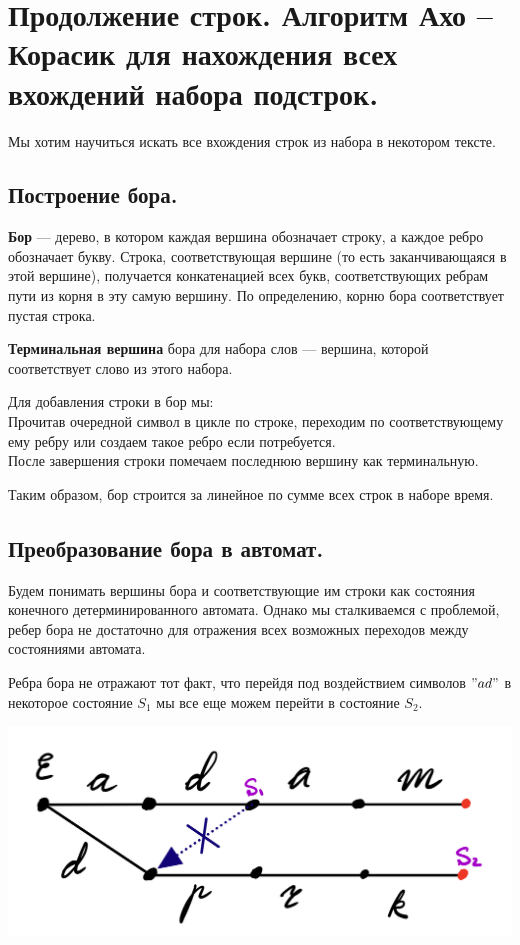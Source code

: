 \section{Продолжение строк. Алгоритм Ахо -- Корасик для нахождения всех вхождений набора подстрок.}%
Мы хотим научиться искать все вхождения строк из набора в некотором тексте.

\subsection{Построение бора.}%
\begin{Def}
	\textbf{Бор} --- дерево, в котором каждая вершина обозначает строку, а каждое ребро обозначает букву. Строка, соответствующая вершине (то есть заканчивающаяся в этой вершине), получается конкатенацией всех букв, соответствующих ребрам пути из корня в эту самую вершину. По определению, корню бора соответствует пустая строка.
\end{Def}

\begin{Def}
	\textbf{Терминальная вершина} бора для набора слов --- вершина, которой соответствует слово из этого набора.
\end{Def}


Для добавления строки в бор мы: \\
Прочитав очередной символ в цикле по строке, переходим по соответствующему ему ребру или создаем такое ребро если потребуется. \\
После завершения строки помечаем последнюю вершину как терминальную.

Таким образом, бор строится за линейное по сумме всех строк в наборе время.

\subsection{Преобразование бора в автомат.}%
Будем понимать вершины бора и соответствующие им строки как состояния конечного детерминированного автомата. Однако мы сталкиваемся с проблемой, ребер бора не достаточно для отражения всех возможных переходов между состояниями автомата. 
\begin{example}
	Ребра бора не отражают тот факт, что перейдя под воздействием символов $"ad"$ в некоторое состояние  $S_1$ мы все еще можем перейти в состояние  $S_2$.
    \begin{center}
        \includegraphics[scale = 0.2]{images/lect06/adam_dprk.jpeg}
    \end{center}
\end{example}


